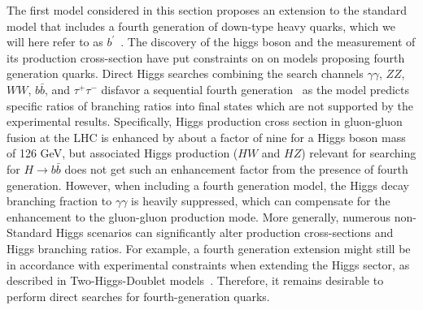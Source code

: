 The first model considered in this section proposes an extension to the standard model that includes a fourth generation of down-type heavy quarks, which we will here refer to as $b^\prime$~\cite{Holdom:2006mr}.
The discovery of the higgs boson and the measurement of its production cross-section have put constraints on on models proposing fourth generation quarks.
Direct Higgs searches combining the search channels $\gamma \gamma$, $ZZ$, $WW$, $b\bar{b}$, and $\tau^{+} \tau^{-}$ disfavor a sequential fourth generation~\cite{Eberhardt:2012gv,Djouadi:2012ae,Eberhardt:2012sb,Eberhardt:2012ck} as the model predicts specific ratios of branching ratios into final states which are not supported by the experimental results.
Specifically, Higgs production cross section in gluon-gluon fusion at the LHC is enhanced by about a factor of nine for a Higgs boson mass of 126 GeV, but associated Higgs production ($HW$ and $HZ$) relevant for searching for $H \rightarrow b\bar{b}$ does not get such an enhancement factor from the presence of fourth generation.
However, when including a fourth generation model, the Higgs decay branching fraction to $\gamma \gamma$ is heavily suppressed, which can compensate for the enhancement to the gluon-gluon production mode.
More generally, numerous non-Standard Higgs scenarios can significantly alter production cross-sections and Higgs branching ratios.
For example, a fourth generation extension might still be in accordance with experimental constraints when extending the Higgs sector, as described in Two-Higgs-Doublet models~\cite{BarShalom:2012ms}. 
Therefore, it remains desirable to perform direct searches for fourth-generation quarks.

